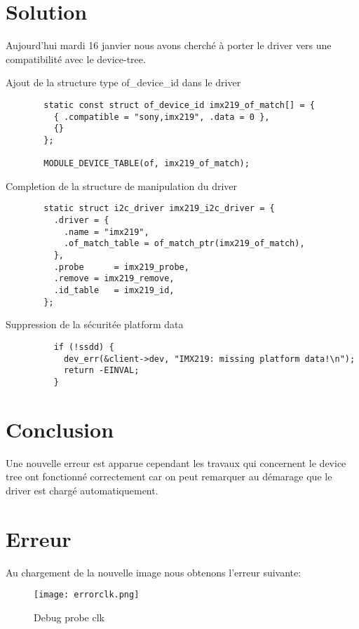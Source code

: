 \section{Solution}
Aujourd'hui mardi 16 janvier nous avons cherché à porter le driver vers
une compatibilité avec le device-tree.
\begin{description}
  \item[Ajout de la structure type of\_device\_id dans le driver]
  \begin{lstlisting}
  static const struct of_device_id imx219_of_match[] = {
    { .compatible = "sony,imx219", .data = 0 },
    {}
  };

  MODULE_DEVICE_TABLE(of, imx219_of_match);
  \end{lstlisting}

  \item[Completion de la structure de manipulation du driver]
  \begin{lstlisting}
  static struct i2c_driver imx219_i2c_driver = {
    .driver = {
      .name = "imx219",
      .of_match_table = of_match_ptr(imx219_of_match),
    },
    .probe		= imx219_probe,
    .remove	= imx219_remove,
    .id_table	= imx219_id,
  };
  \end{lstlisting}

  \item[Suppression de la sécuritée platform data]
  \begin{lstlisting}
    if (!ssdd) {
      dev_err(&client->dev, "IMX219: missing platform data!\n");
      return -EINVAL;
    }
    \end{lstlisting}
\end{description}

\section{Conclusion}
Une nouvelle erreur est apparue cependant les travaux qui concernent le
device tree ont fonctionné correctement car on peut remarquer au démarage
que le driver est chargé automatiquement.

\section{Erreur}
Au chargement de la nouvelle image nous obtenons l'erreur suivante:

\begin{figure}[th]
  \centering
  \texttt{[image: errorclk.png]}
  \decoRule
  \caption{Debug probe clk}  \label{fig:Debug-probe-clk}
\end{figure}


